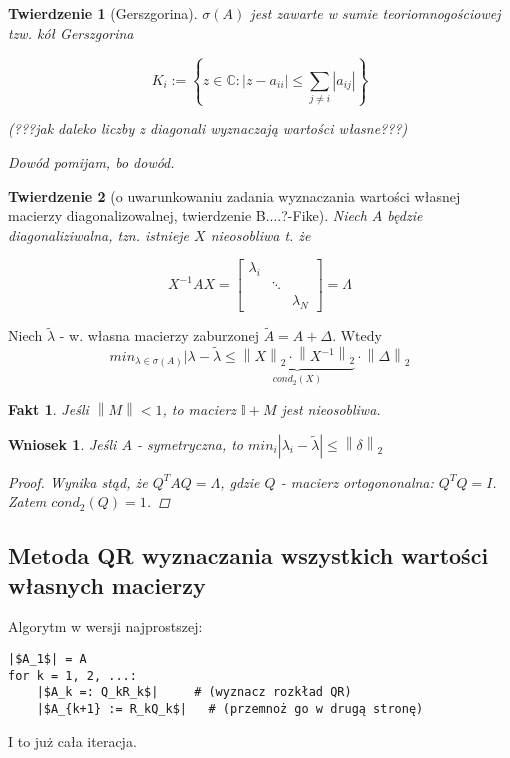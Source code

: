 \documentclass[hidelinks,a4paper,fleqn,oneside]{book}
\newcommand{\II}{\mathbb{I}}
\newcommand{\CC}{\mathbb{C}}
\newcommand{\norm}[1]{\left\lVert#1\right\rVert}
\newtheorem{wniosek}{Wniosek}
\newtheorem{fakt}{Fakt}
\newtheorem{twierdz}{Twierdzenie}
\begin{document}
\begin{twierdz}[Gerszgorina] $\sigma(A)$ jest zawarte w sumie teoriomnogościowej tzw. kół Gerszgorina
	
	\[
		K_{i} := \left\{ z \in \CC: |z - a_{ii} | \leq \sum_{j \neq i} |a_{ij}| \right\}
	\]
	
	(???jak daleko liczby z diagonali wyznaczają wartości własne???)
	
	
	Dowód pomijam, bo dowód.
	
\end{twierdz}

\begin{twierdz}[o uwarunkowaniu zadania wyznaczania wartości własnej macierzy diagonalizowalnej, twierdzenie B....?-Fike]
	Niech $A$ będzie diagonaliziwalna, tzn. istnieje $X$ nieosobliwa t. że
	
	\[
		X^{-1}AX = \left[ \begin{array}{ccc} \lambda_i & & \\ & \ddots \\ & & \lambda_N \end{array} \right] = \Lambda
	\]
\end{twierdz}

Niech $\tilde{\lambda}$ - w. własna macierzy zaburzonej $\tilde{A} = A + \Delta$. Wtedy
\[
	min_{\lambda \in \sigma(A)} |\lambda - \tilde{\lambda} \leq \underbrace{\norm{X} _2 \cdot \norm{X^{-1}}_2}_{cond_2(X)} \cdot \norm{\Delta}_2
\]

\begin{fakt}Jeśli $\norm{M} < 1$, to macierz $\II+M$ jest nieosobliwa.
\end{fakt}

\begin{wniosek}
	Jeśli $A$ - symetryczna, to $min_i |\lambda_i - \tilde{\lambda}| \leq \norm{\delta}_2$
	
	\begin{proof} Wynika stąd, że $Q^TAQ = \Lambda$, gdzie $Q$ - macierz ortogononalna: $Q^TQ = I$. Zatem $cond_2(Q) = 1$.\end{proof}
\end{wniosek}

\subsection{Metoda QR wyznaczania wszystkich wartości własnych macierzy}
Algorytm w wersji najprostszej:
\begin{verbatim}
|$A_1$| = A
for k = 1, 2, ...:
    |$A_k =: Q_kR_k$|     # (wyznacz rozkład QR)
    |$A_{k+1} := R_kQ_k$|   # (przemnoż go w drugą stronę)
\end{verbatim}
I to już cała iteracja.
\end{document}
